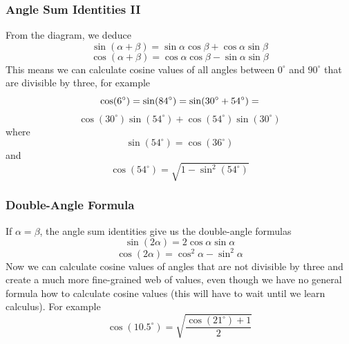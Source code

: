 \documentclass[xcolor=dvipsnames]{beamer}
\begin{document}
\begin{frame}
  \frametitle{Angle Sum Identities II}
From the diagram, we deduce
\begin{equation}
  \label{eq:eitaiquu}
  \sin(\alpha+\beta)=\sin\alpha\cos\beta+\cos\alpha\sin\beta
\end{equation}
\begin{equation}
  \label{eq:iasoojou}
  \cos(\alpha+\beta)=\cos\alpha\cos\beta-\sin\alpha\sin\beta
\end{equation}
This means we can calculate cosine values of all angles between
$0^{\circ}$ and $90^{\circ}$ that are divisible by three, for example
\begin{equation}
  \label{eq:uziajoch}
  \cos(6^{\circ})=\sin(84^{\circ})=\sin(30^{\circ}+54^{\circ})=\notag
\end{equation}
\begin{equation}
  \label{eq:chaevuer}
  \cos(30^{\circ})\sin(54^{\circ})+\cos(54^{\circ})\sin(30^{\circ})
\end{equation}
where
\begin{equation}
  \label{eq:puhahwie}
  \sin(54^{\circ})=\cos(36^{\circ})
\end{equation}
and
\begin{equation}
  \label{eq:chooteph}
  \cos(54^{\circ})=\sqrt{1-\sin^{2}(54^{\circ})}
\end{equation}
\end{frame}

\begin{frame}
  \frametitle{Double-Angle Formula}
  If $\alpha=\beta$, the angle sum identities give us the double-angle
  formulas
  \begin{equation}
    \label{eq:icuchodo}
    \sin(2\alpha)=2\cos\alpha\sin\alpha
  \end{equation}
  \begin{equation}
    \label{eq:woojahtu}
    \cos(2\alpha)=\cos^{2}\alpha-\sin^{2}\alpha
  \end{equation}
  Now we can calculate cosine values of angles that are not divisible
  by three and create a much more fine-grained web of values, even
  though we have no general formula how to calculate cosine values
  (this will have to wait until we learn calculus). For example
  \begin{equation}
    \label{eq:aoghaehu}
    \cos(10.5^{\circ})=\sqrt{\frac{\cos(21^{\circ})+1}{2}}
  \end{equation}
\end{frame}
\end{document}
